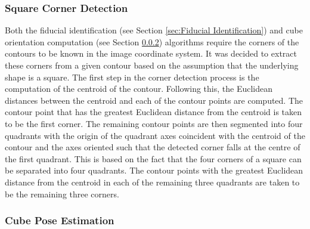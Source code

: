 
\subsubsection{Square Corner Detection} \label{sec:Square Corner Detection}

Both the fiducial identification (see Section \ref{sec:Fiducial Identification}) and cube orientation computation (see Section \ref{sec:Cube Pose Estimation}) algorithms require the corners of the contours to be known in the image coordinate system. It was decided to extract these corners from a given contour based on the assumption that the underlying shape is a square. The first step in the corner detection process is the computation of the centroid of the contour. Following this, the Euclidean distances between the centroid and each of the contour points are computed. The contour point that has the greatest Euclidean distance from the centroid is taken to be the first corner. The remaining contour points are then segmented into four quadrants with the origin of the quadrant axes coincident with the centroid of the contour and the axes oriented such that the detected corner falls at the centre of the first quadrant. This is based on the fact that the four corners of a square can be separated into four quadrants. The contour points with the greatest Euclidean distance from the centroid in each of the remaining three quadrants are taken to be the remaining three corners.


\subsubsection{Cube Pose Estimation} \label{sec:Cube Pose Estimation}

